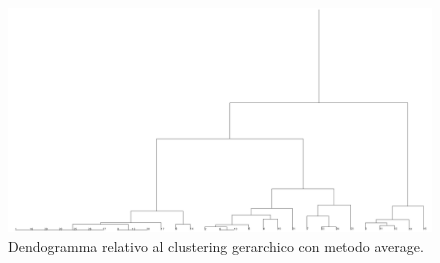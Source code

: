 \documentclass[12pt]{article}
\begin{document}
\begin{figure}[H]
	\includegraphics[width=\textwidth]{img/hierarchical-average.png}
	\caption{Dendogramma relativo al clustering gerarchico con metodo average.}
	\label{fig:dendo-average}
\end{figure}

\end{document}
